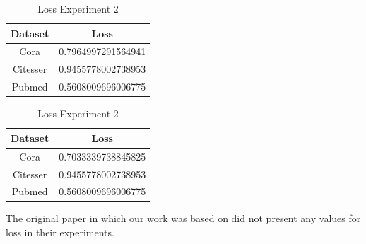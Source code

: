 \begin {table}[ht]
\parbox{.45\linewidth}{
\begin{center}
  \begin{tabular}{|c|c|}
  \hline
  Dataset       &  Loss\\ \hline
  Cora          & 0.7964997291564941 \\ 
  Citesser      & 0.9455778002738953 \\
  Pubmed        & 0.5608009696006775 \\
  \hline
  \end{tabular}
\end{center}
\caption {Loss Experiment 1} \label{tab:loss1} 
}
\hfill
\parbox{.45\linewidth}{
\begin{center}
  \begin{tabular}{|c|c|}
  \hline
  Dataset       &  Loss\\ \hline
  Cora          & 0.7033339738845825 \\ 
  Citesser      & 0.9455778002738953 \\
  Pubmed        & 0.5608009696006775 \\
  \hline
  \end{tabular}
\end{center}
\caption {Loss Experiment 2} \label{tab:loss2} 
}
\end{table}

The original paper in which our work was based on did not present any values for loss in their experiments.